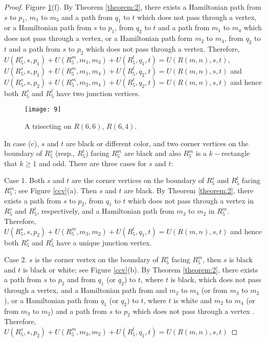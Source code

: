 \documentclass[preprint,12pt]{elsarticle}
\begin{document}
\begin{proof}
Figure \ref{cc}(f). By Theorem \ref{theorem:2}, there exists a
Hamiltonian path from $s$ to $p_{1}$, $m_1$ to $m_3$ and a path from
$q_1$ to $t$ which does not pass through a vertex, or a Hamiltonian path from $s$ to
$p_{1}$, from $q_2$ to $t$ and a path from $m_1$ to $m_4$ which does
not pass through a vertex, or a Hamiltonian path form $m_2$ to $m_4$, from $q_2$ to $t$
and a path from $s$ to $p_{2}$ which does not pass through a vertex.
Therefore,
$U(R_{5}^{s},s,p_{1})+U(R_{5}^{m},m_{1},m_{3})+U(R_{5}^{t},q_{1},t)=U(R(m,n),s,t)$,
$U(R_{5}^{s},s,p_{1})+U(R_{5}^{m},m_{1},m_{4})+U(R_{5}^{t},q_{2},t)=U(R(m,n),s,t)$
and
$U(R_{5}^{s},s,p_{2})+U(R_{5}^{m},m_{2},m_{4})+U(R_{5}^{t},q_{2},t)=U(R(m,n),s,t)$
and hence both $R^{s}_{5}$ and $R^{t}_{5}$ have two junction
vertices.\\
\begin{figure}[tb]
  \centering
  \texttt{[image: 9]}
  \caption[]{\small A trisecting on $R(6,6)$, $R(6,4)$.}
  \label{cc}
\end{figure}
In case (c), $s$ and $t$ are black or different color, and two
corner vertices on the boundary of $R^{s}_{5}$ (resp., $R^{t}_{5}$)
facing $R^{m}_{5}$ are black and also $R^{m}_{5}$ is a $k-$rectangle
that $k\geq 1$ and odd. There are three cases for $s$ and $t$:
\par Case 1. Both $s$ and $t$ are the corner vertices on the boundary
of $R^{s}_{5}$ and $R^{t}_{5}$ facing $R^{m}_{5}$; see Figure
\ref{ccv}(a). Then $s$ and $t$ are black. By Theorem
\ref{theorem:2}, there exists a path from $s$ to $p_{2}$, from
$q_{1}$ to $t$ which does not pass through a vertex in $R^{s}_{5}$
and $R^{t}_{5}$, respectively, and a Hamiltonian path from $m_{3}$
to $m_{2}$ in $R^{m}_{5}$. Therefore,
$U(R_{5}^{s},s,p_{2})+U(R_{5}^{m},m_{3},m_{2})+U(R_{5}^{t},q_{1},t)=U(R(m,n),s,t)$
and hence both $R^{s}_5$ and $R^{t}_5$ have a unique junction
vertex.
\par Case 2. $s$ is the corner vertex on the boundary of $R^{s}_{5}$
facing $R^{m}_{5}$, then $s$ is black and $t$ is black or white; see
Figure \ref{ccv}(b). By Theorem \ref{theorem:2}, there exists a path
from $s$ to $p_{2}$ and from $q_{1}$ (or $q_{2}$) to $t$, where $t$
is black, which does not pass through a vertex, and a Hamiltonian
path from and $m_{2}$
to $m_{4}$ (or from $m_{3}$ to $m_{2}$), or a Hamiltonian path from $q_1$ (or $q_2)$ to $t$, where $t$ is white and $m_{2}$
to $m_{4}$ (or from $m_{3}$ to $m_{2}$) and a path
from $s$ to $p_{2}$ which does not pass through a vertex . Therefore,
$U(R_{5}^{s},s,p_{2})+U(R_{5}^{m},m_{3},m_{2})+U(R_{5}^{t},q_{1},t)=U(R(m,n),s,t)$

\end{proof}
\end{document}
